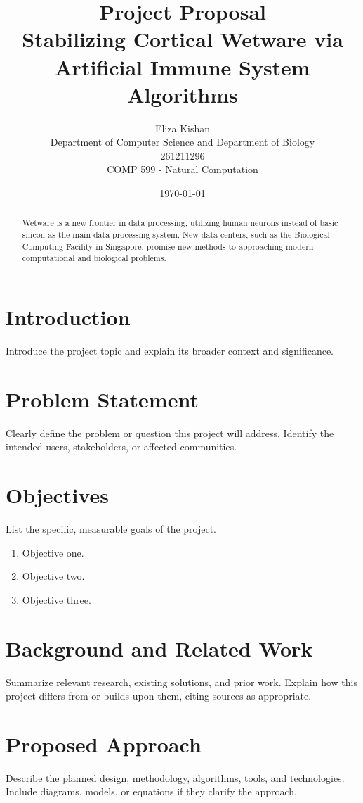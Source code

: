 \documentclass[11pt]{article}
\title{\textbf{Project Proposal}\\[0.5em]
\large Stabilizing Cortical Wetware via Artificial Immune System Algorithms  }
\author{Eliza Kishan \\
Department of Computer Science and Department of Biology \\
261211296 \\
COMP 599 - Natural Computation}
\date{\today}
\begin{document}
\maketitle

\begin{abstract}
Wetware is a new frontier in data processing, utilizing human neurons instead of basic silicon as the main data-processing
system. New data centers, such as the Biological Computing Facility in Singapore, promise new methods to approaching modern computational 
and biological problems. 
\end{abstract}

\section{Introduction}
Introduce the project topic and explain its broader context and significance.

\section{Problem Statement}
Clearly define the problem or question this project will address. Identify the
intended users, stakeholders, or affected communities.

\section{Objectives}
List the specific, measurable goals of the project.
\begin{enumerate}[label=\arabic*.]
	\item Objective one.
	\item Objective two.
	\item Objective three.
\end{enumerate}

\section{Background and Related Work}
Summarize relevant research, existing solutions, and prior work. Explain how this
project differs from or builds upon them, citing sources as appropriate.

\section{Proposed Approach}
Describe the planned design, methodology, algorithms, tools, and technologies.
Include diagrams, models, or equations if they clarify the approach.
\end{document}
